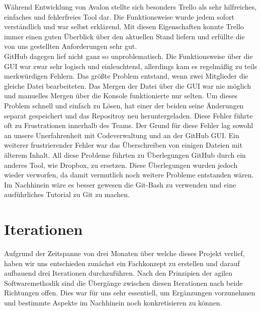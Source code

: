 Während Entwicklung von Avalon stellte sich besonders Trello als sehr hilfreiches, einfaches und fehlerfreies Tool dar. Die Funktionsweise wurde jedem sofort verständlich und war selbst erklärend. Mit diesen Eigenschaften konnte Trello immer einen guten Überblick über den aktuellen Stand liefern und erfüllte die von uns gestellten Anforderungen sehr gut.\\
GitHub dagegen lief nicht ganz so unproblematisch. Die Funktionsweise über die GUI war zwar sehr logisch und einleuchtend, allerdings kam es regelmäßig zu teils merkwürdigen Fehlern. Das größte Problem entstand, wenn zwei Mitglieder die gleiche Datei bearbeiteten. Das Mergen der Datei über die GUI war nie möglich und manuelles Mergen über die Konsole funktionierte nur selten. Um dieses Problem schnell und einfach zu Lösen, hat einer der beiden seine Änderungen separat gespeichert und das Repositroy neu heruntergeladen. Diese Fehler führte oft zu Frustrationen innerhalb des Teams. Der Grund für diese Fehler lag sowohl an unsere Unerfahrenheit mit Codeverwaltung und an der GitHub GUI. Ein weiterer frustrierender Fehler war das Überschreiben von einigen Dateien mit älterem Inhalt. All diese Probleme führten zu Überlegungen GitHub durch ein anderes Tool, wie Dropbox, zu ersetzen. Diese Überlegungen wurden jedoch wieder verworfen, da damit vermutlich noch weitere Probleme entstanden wären. Im Nachhinein wäre es besser gewesen die Git-Bash zu verwenden und eine ausführliches Tutorial zu Git zu machen.

\section{Iterationen}

Aufgrund der Zeitspanne von drei Monaten über welche dieses Projekt verlief, haben wir uns entschieden zunächst ein Fachkonzept zu erstellen und darauf aufbauend drei Iterationen durchzuführen. Nach den Prinzipien der agilen Softwaremethodik sind die Übergänge zwischen diesen Iterationen nach beide Richtungen offen. Dies war für uns sehr essentiell, um Ergänzungen vorzunehmen  und bestimmte Aspekte im Nachhinein noch konkretisieren zu können.

